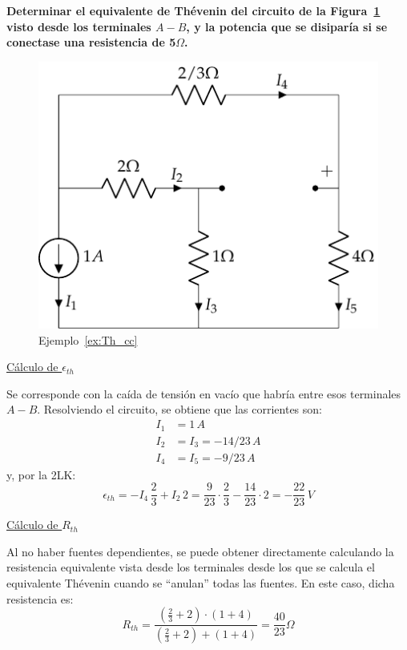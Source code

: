 \begin{example}\label{ex:Th_cc}
  \textbf{Determinar el equivalente de Thévenin del circuito de la
    Figura~\ref{fig:ej_Th_cc} visto desde los terminales $A-B$, y la
    potencia que se disiparía si se conectase una resistencia de
    5$\Omega$.}
  \begin{figure}[H]
    \centering \includegraphics{../figs/ej_Th_cc1.pdf}
    \caption{Ejemplo~\ref{ex:Th_cc}}
    \label{fig:ej_Th_cc}
  \end{figure}
    
  \underline{Cálculo de $\epsilon_{th}$}
    
  Se corresponde con la caída de tensión en vacío que habría entre
  esos terminales $A-B$. Resolviendo el circuito, se obtiene que las
  corrientes son:
  \begin{align*}
    I_1&=1\,A\\
    I_2&=I_3=-14/23\,A\\
    I_4&=I_5=-9/23\,A
  \end{align*}
  y, por la 2LK:
  \begin{equation*}
    \epsilon_{th}=-I_4\,\dfrac{2}{3}+I_2\,2=\dfrac{9}{23}\cdot\dfrac{2}{3}-\dfrac{14}{23}\cdot 2=-\dfrac{22}{23}\,V
  \end{equation*}
    
  \underline{Cálculo de $R_{th}$}
    
  Al no haber fuentes dependientes, se puede obtener directamente
  calculando la resistencia equivalente vista desde los terminales
  desde los que se calcula el equivalente Thévenin cuando se
  ``anulan'' todas las fuentes. En este caso, dicha resistencia es:
  \begin{equation*}
    R_{th}=\dfrac{(\frac{2}{3}+2)\cdot(1+4)}{(\frac{2}{3}+2)+(1+4)}=\dfrac{40}{23}\Omega
  \end{equation*}
    

\end{example}
